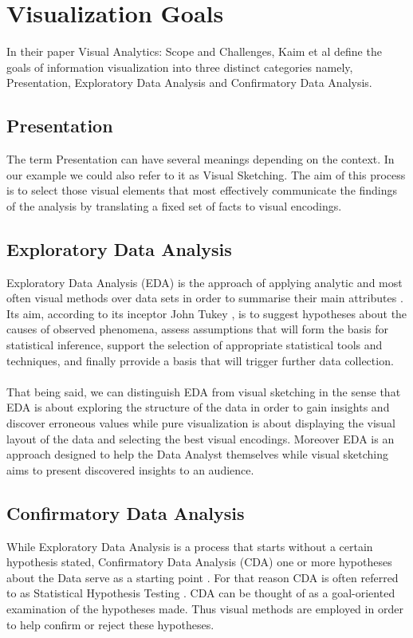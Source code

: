 \documentclass[16pt]{extreport}
\begin{document}
\section{Visualization Goals}
\large{
In their paper Visual Analytics: Scope and Challenges, Kaim et al \cite{kaim} define the goals of information visualization into three distinct categories namely, Presentation, Exploratory Data Analysis and Confirmatory Data Analysis.}

\subsection{Presentation} 
\large{
The term Presentation can have several meanings depending on the context. In our example we could also refer to it as Visual Sketching. The aim of this process is to select those visual elements that most effectively communicate the findings of the analysis by translating a fixed set of facts to visual encodings.}

\subsection{Exploratory Data Analysis}
\large{Exploratory Data Analysis (EDA) is the approach of applying analytic and most often visual methods over data sets in order to summarise their main attributes \cite{eda1}. Its aim, according to its inceptor John Tukey \cite{eda2}, is to suggest hypotheses about the causes of observed phenomena, assess assumptions that will form the basis for statistical inference, support the selection of appropriate statistical tools and techniques, and finally prrovide a basis that will trigger further data collection. \\\\ That being said, we can distinguish EDA from visual sketching in the sense that EDA is about exploring the structure of the data in order to gain insights and discover erroneous values while pure visualization is about displaying the visual layout of the data and selecting the best visual encodings. Moreover EDA is an approach designed to help the Data Analyst themselves while visual sketching aims to present discovered insights to an audience.}

\subsection{Confirmatory Data Analysis} 
\large{While Exploratory Data Analysis is a process that starts without a certain hypothesis stated, Confirmatory Data Analysis (CDA) one or more hypotheses about the Data serve as a starting point \cite{kaim}. For that reason CDA is often referred to as Statistical Hypothesis Testing \cite{cda1}. CDA can be thought of as a goal-oriented examination of the hypotheses made. Thus visual methods are employed in order to help confirm or reject these hypotheses.}
\end{document}
